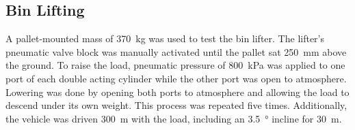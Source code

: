 \documentclass[preprint,authoryear,12pt]{elsarticle}
\begin{document}




  \subsection{Bin Lifting}

    A pallet-mounted mass of \SI{370}{\kilo\gram} was used to test the bin lifter.
    The lifter's pneumatic valve block was manually activated until the pallet sat \SI{250}{\milli\meter} above the ground.
    To raise the load, pneumatic pressure of \SI{800}{\kilo\pascal} was applied to one port of each double acting cylinder while the other port was open to atmosphere.
    Lowering was done by opening both ports to atmosphere and allowing the load to descend under its own weight.
    This process was repeated five times.
    Additionally, the vehicle was driven \SI{300}{\meter} with the load, including an \SI{3.5}{\degree} incline for \SI{30}{\meter}.
\end{document}
